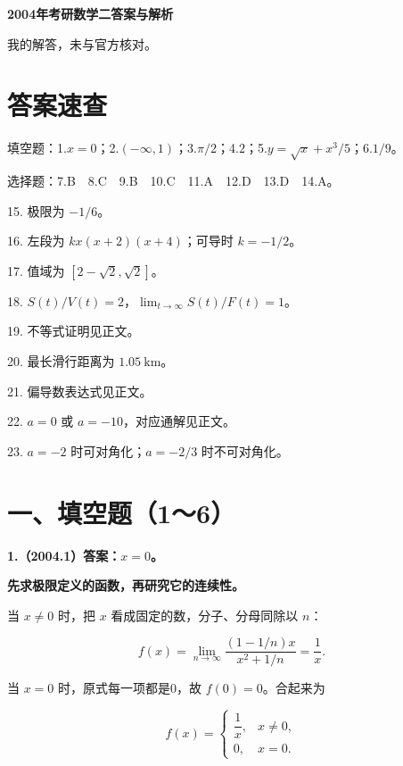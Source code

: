 \documentclass[UTF8,11pt,fontset=windows]{ctexart}
\begin{document}
{\LARGE\bfseries 2004年考研数学二答案与解析\par}\vspace{6pt}

\begingroup\color{gray}我的解答，未与官方核对。\par\endgroup

\section*{答案速查}

\begingroup\color{gray}填空题：1.$x=0$；2.$(-\infty,1)$；3.$\pi/2$；4.$2$；5.$y=\sqrt x+x^3/5$；6.$1/9$。\par\endgroup

\begingroup\color{gray}选择题：7.B　8.C　9.B　10.C　11.A　12.D　13.D　14.A。\par\endgroup

15. 极限为 $-1/6$。

16. 左段为 $kx(x+2)(x+4)$；可导时 $k=-1/2$。

17. 值域为 $[2-\sqrt2,\sqrt2]$。

18. $S(t)/V(t)=2$，$\lim_{t\to\infty}S(t)/F(t)=1$。

19. 不等式证明见正文。

20. 最长滑行距离为 $1.05\ \mathrm{km}$。

21. 偏导数表达式见正文。

22. $a=0$ 或 $a=-10$，对应通解见正文。

23. $a=-2$ 时可对角化；$a=-2/3$ 时不可对角化。

\clearpage

\section*{一、填空题（1～6）}

\textbf{1.（2004.1）答案：$x=0$。}

\textbf{先求极限定义的函数，再研究它的连续性。}

当 $x\ne0$ 时，把 $x$ 看成固定的数，分子、分母同除以 $n$：

$$
f(x)=\lim_{n\to\infty}\frac{(1-1/n)x}{x^2+1/n}=\frac1x.
$$

当 $x=0$ 时，原式每一项都是0，故 $f(0)=0$。合起来为

$$
f(x)=\begin{cases}\dfrac1x,&x\ne0,\\0,&x=0.\end{cases}
$$
\end{document}
